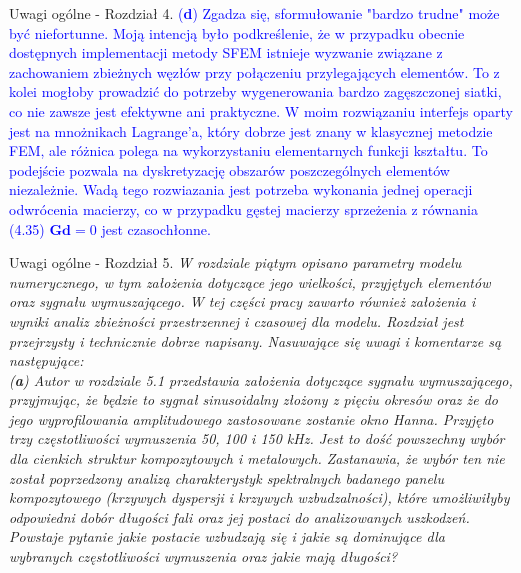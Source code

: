 \documentclass[10pt,aspectratio=169]{beamer} %
\begin{document}
\begin{frame}[label=frame11]{Uwagi ogólne - Rozdział 4.}\justifying
\textcolor{blue}{(\textbf{d}) Zgadza się, sformułowanie "bardzo trudne" może być niefortunne. Moją intencją było podkreślenie, że w przypadku obecnie dostępnych implementacji metody SFEM istnieje wyzwanie związane z zachowaniem zbieżnych węzłów przy połączeniu przylegających elementów. To z kolei mogłoby prowadzić do potrzeby wygenerowania bardzo zagęszczonej siatki, co nie zawsze jest efektywne ani praktyczne. W moim rozwiązaniu interfejs oparty jest na mnożnikach Lagrange’a, który dobrze jest znany w klasycznej metodzie FEM, ale różnica polega na wykorzystaniu elementarnych funkcji kształtu. To podejście pozwala na dyskretyzację obszarów poszczególnych elementów niezależnie. Wadą tego rozwiazania jest potrzeba wykonania jednej operacji odwrócenia macierzy, co w przypadku  gęstej macierzy sprzeżenia z równania (4.35) \(\textbf{G}\mathrm{\textbf{d}}=0\) jest czasochłonne.}
\end{frame}

\begin{frame}[label=frame12]{Uwagi ogólne - Rozdział 5.}\justifying
\textit{W rozdziale piątym opisano parametry modelu numerycznego, w tym założenia dotyczące jego wielkości, przyjętych elementów oraz sygnału wymuszającego. W tej części pracy zawarto również założenia i wyniki analiz zbieżności przestrzennej i czasowej dla modelu. Rozdział jest przejrzysty i technicznie dobrze napisany. Nasuwające się uwagi i komentarze są następujące:\\
(\textbf{a}) Autor w rozdziale 5.1 przedstawia założenia dotyczące sygnału wymuszającego,
przyjmując, że będzie to sygnał sinusoidalny złożony z pięciu okresów oraz że do jego wyprofilowania amplitudowego zastosowane zostanie okno Hanna. Przyjęto trzy częstotliwości wymuszenia 50, 100 i 150 kHz. Jest to dość powszechny wybór dla cienkich struktur kompozytowych i metalowych. Zastanawia, że wybór ten nie został poprzedzony analizą charakterystyk spektralnych badanego panelu kompozytowego (krzywych dyspersji i krzywych wzbudzalności), które umożliwiłyby odpowiedni dobór długości fali oraz jej postaci do analizowanych uszkodzeń. Powstaje pytanie jakie postacie wzbudzają się i jakie są dominujące dla wybranych częstotliwości wymuszenia oraz jakie mają długości?}
\end{frame}
\end{document}
